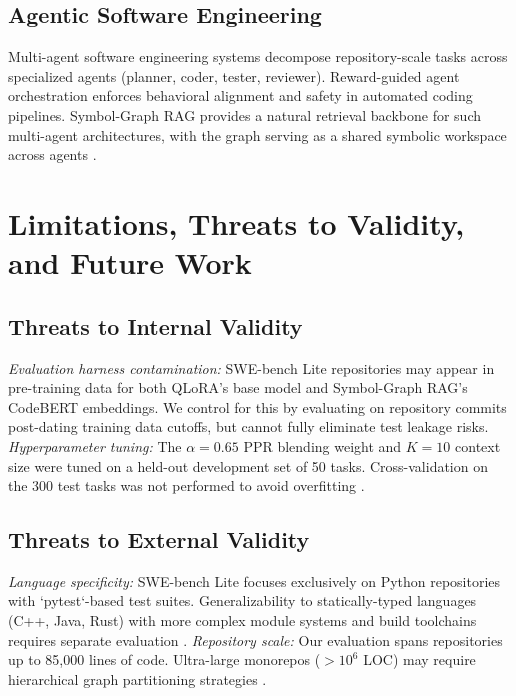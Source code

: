 \documentclass[10pt,journal,compsoc,twocolumn]{IEEEtran}
\begin{document}
\subsection{Agentic Software Engineering}


Multi-agent software engineering systems \cite{arxiv_2404_01131,arxiv_2412_06333} decompose repository-scale tasks across specialized agents (planner, coder, tester, reviewer). Reward-guided agent orchestration \cite{crossref_10_1109_access_2026_3656309} enforces behavioral alignment and safety in automated coding pipelines. Symbol-Graph RAG provides a natural retrieval backbone for such multi-agent architectures, with the graph serving as a shared symbolic workspace across agents \cite{crossref_10_18653_v1_2026_findings_acl_1933}.




\section{Limitations, Threats to Validity, and Future Work}



\subsection{Threats to Internal Validity}


\textit{Evaluation harness contamination:} SWE-bench Lite repositories may appear in pre-training data for both QLoRA's base model and Symbol-Graph RAG's CodeBERT embeddings. We control for this by evaluating on repository commits post-dating training data cutoffs, but cannot fully eliminate test leakage risks. \textit{Hyperparameter tuning:} The $\alpha = 0.65$ PPR blending weight and $K = 10$ context size were tuned on a held-out development set of 50 tasks. Cross-validation on the 300 test tasks was not performed to avoid overfitting \cite{arxiv_2203_02155}.


\subsection{Threats to External Validity}


\textit{Language specificity:} SWE-bench Lite focuses exclusively on Python repositories with `pytest`-based test suites. Generalizability to statically-typed languages (C++, Java, Rust) with more complex module systems and build toolchains requires separate evaluation \cite{doaj_001772c2113c476d9d5d40452c8e10e1}. \textit{Repository scale:} Our evaluation spans repositories up to 85,000 lines of code. Ultra-large monorepos ($>10^6$ LOC) may require hierarchical graph partitioning strategies \cite{arxiv_2411_15594}.
\end{document}
